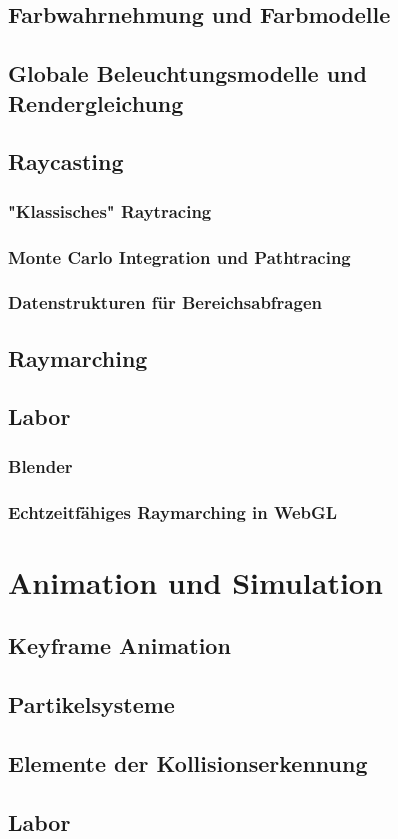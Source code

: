 \documentclass[]{article}
\begin{document}
\subsection{Farbwahrnehmung und Farbmodelle}
\subsection{Globale Beleuchtungsmodelle und Rendergleichung}
\subsection{Raycasting}
\subsubsection{"Klassisches" Raytracing}
\subsubsection{Monte Carlo Integration und Pathtracing}
\subsubsection{Datenstrukturen für Bereichsabfragen}

\subsection{Raymarching}
\subsection{Labor}
\subsubsection{Blender}
\subsubsection{Echtzeitfähiges Raymarching in WebGL}

\section{Animation und Simulation}
\subsection{Keyframe Animation}
\subsection{Partikelsysteme}
\subsection{Elemente der Kollisionserkennung}
\subsection{Labor}
\end{document}
